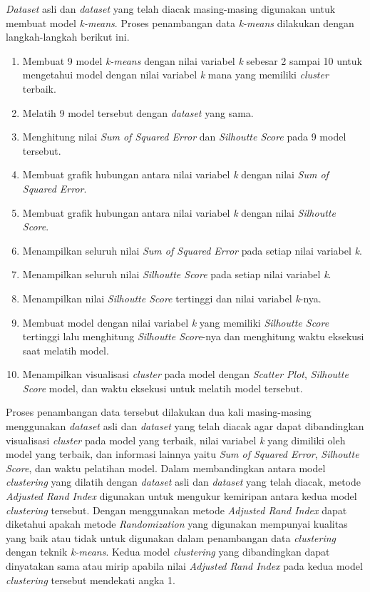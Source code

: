 \textit{Dataset} asli dan \textit{dataset} yang telah diacak masing-masing digunakan untuk membuat model \textit{k-means}. Proses penambangan data \textit{k-means} dilakukan dengan langkah-langkah berikut ini.
\begin{enumerate}
    \item Membuat 9 model \textit{k-means} dengan nilai variabel \textit{k} sebesar 2 sampai 10 untuk mengetahui model dengan nilai variabel \textit{k} mana yang memiliki \textit{cluster} terbaik.
    \item Melatih 9 model tersebut dengan \textit{dataset} yang sama.
    \item Menghitung nilai \textit{Sum of Squared Error} dan \textit{Silhoutte Score} pada 9 model tersebut.
    \item Membuat grafik hubungan antara nilai variabel \textit{k} dengan nilai \textit{Sum of Squared Error}.
    \item Membuat grafik hubungan antara nilai variabel \textit{k} dengan nilai \textit{Silhoutte Score}.
    \item Menampilkan seluruh nilai \textit{Sum of Squared Error} pada setiap nilai variabel \textit{k}.
    \item Menampilkan seluruh nilai \textit{Silhoutte Score} pada setiap nilai variabel \textit{k}.
    \item Menampilkan nilai \textit{Silhoutte Score} tertinggi dan nilai variabel \textit{k}-nya.
    \item Membuat model dengan nilai variabel \textit{k} yang memiliki \textit{Silhoutte Score} tertinggi lalu menghitung \textit{Silhoutte Score}-nya dan menghitung waktu eksekusi saat melatih model.
    \item Menampilkan visualisasi \textit{cluster} pada model dengan \textit{Scatter Plot}, \textit{Silhoutte Score} model, dan waktu eksekusi untuk melatih model tersebut.
\end{enumerate}
Proses penambangan data tersebut dilakukan dua kali masing-masing menggunakan \textit{dataset} asli dan \textit{dataset} yang telah diacak agar dapat dibandingkan visualisasi \textit{cluster} pada model yang terbaik, nilai variabel \textit{k} yang dimiliki oleh model yang terbaik, dan informasi lainnya yaitu \textit{Sum of Squared Error}, \textit{Silhoutte Score}, dan waktu pelatihan model. Dalam membandingkan antara model \textit{clustering} yang dilatih dengan \textit{dataset} asli dan \textit{dataset} yang telah diacak, metode \textit{Adjusted Rand Index} digunakan untuk mengukur kemiripan antara kedua model \textit{clustering} tersebut. Dengan menggunakan metode \textit{Adjusted Rand Index} dapat diketahui apakah metode \textit{Randomization} yang digunakan mempunyai kualitas yang baik atau tidak untuk digunakan dalam penambangan data \textit{clustering} dengan teknik \textit{k-means}. Kedua model \textit{clustering} yang dibandingkan dapat dinyatakan sama atau mirip apabila nilai \textit{Adjusted Rand Index} pada kedua model \textit{clustering} tersebut mendekati angka 1.

